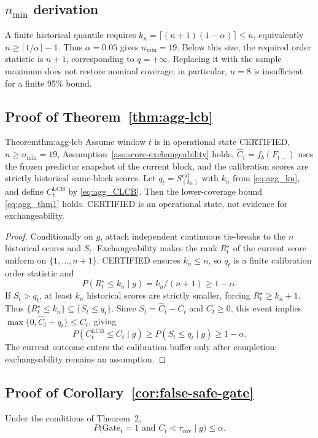 \subsection{\texorpdfstring{$n_{\min}$}{n-min} derivation}

A finite historical quantile requires
$k_n=\lceil(n+1)(1-\alpha)\rceil\le n$, equivalently
$n\ge\lceil1/\alpha\rceil-1$. Thus $\alpha=0.05$ gives $n_{\min}=19$.
Below this size, the required order statistic is $n+1$, corresponding to
$q=+\infty$. Replacing it with the sample maximum does not restore nominal
coverage; in particular, $n=8$ is insufficient for a finite 95\% bound.

\subsection{Proof of Theorem~\ref{thm:agg-lcb}}
\begin{restated}{Theorem}{thm:agg-lcb}
Assume window $t$ is in operational state CERTIFIED, $n\ge n_{\min}=19$,
Assumption~\ref{ass:score-exchangeability} holds, $\widehat C_t=f_b(F_{t-})$
uses the frozen predictor snapshot of the current block, and the calibration
scores are strictly historical same-block scores.  Let
$q_t=S_{(k_n)}^{\mathrm{cal}}$ with $k_n$ from \eqref{eq:agg_kn}, and define
$C^{\mathrm{LCB}}_t$ by \eqref{eq:agg_CLCB}.  Then the lower-coverage bound \eqref{eq:agg_thm1} holds.
CERTIFIED is an operational state, not evidence for exchangeability.
\end{restated}
\begin{proof}
Conditionally on $g$, attach independent continuous tie-breaks to the $n$
historical scores and $S_t$. Exchangeability makes the rank $R_t^\star$ of
the current score uniform on $\{1,\ldots,n+1\}$. CERTIFIED ensures
$k_n\le n$, so $q_t$ is a finite calibration order statistic and
\[
P(R_t^\star\le k_n\mid g)=k_n/(n+1)\ge1-\alpha.
\]
If $S_t>q_t$, at least $k_n$ historical scores are strictly smaller, forcing
$R_t^\star\ge k_n+1$. Thus
$\{R_t^\star\le k_n\}\subseteq\{S_t\le q_t\}$.
Since $S_t=\widehat C_t-C_t$ and $C_t\ge0$, this event implies
$\max\{0,\widehat C_t-q_t\}\le C_t$, giving
\[
P(C_t^{\mathrm{LCB}}\le C_t\mid g)
\ge P(S_t\le q_t\mid g)\ge1-\alpha.
\]
The current outcome enters the calibration buffer only after completion;
exchangeability remains an assumption.
\end{proof}

\subsection{Proof of Corollary~\ref{cor:false-safe-gate}}
\begin{corollary}
\label{cor:false-safe-gate}
Under the conditions of Theorem~2,
\begin{equation}
 P\bigl(\mathrm{Gate}_t=1\text{ and }C_t<\tau_{\mathrm{cov}}\mid g\bigr)
 \le\alpha.
 \label{eq:agg_cor2}
\end{equation}
\end{corollary}

